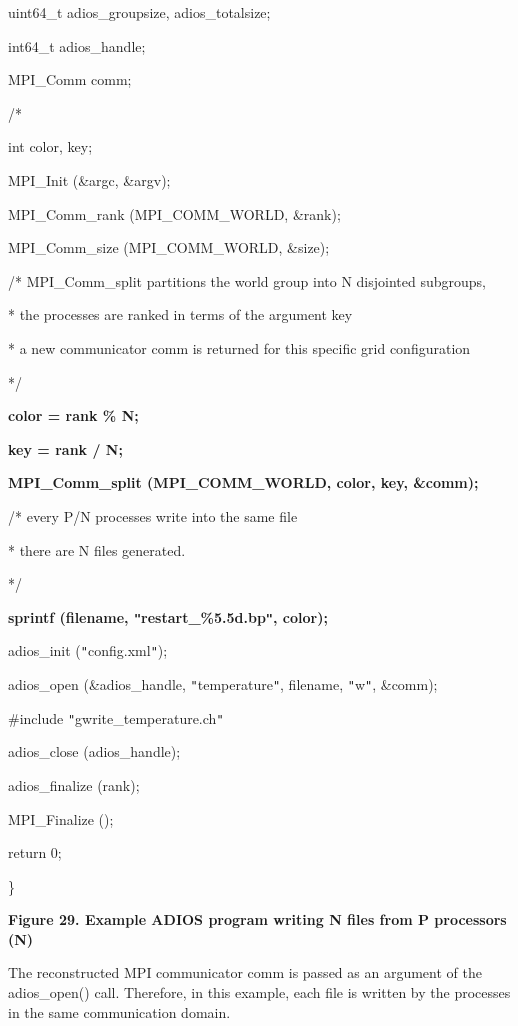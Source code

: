 uint64\_t      adios\_groupsize, adios\_totalsize;

int64\_t     adios\_handle;

MPI\_Comm comm;

/* 

int              color, key;

MPI\_Init (\&argc, \&argv);

MPI\_Comm\_rank (MPI\_COMM\_WORLD, \&rank);

MPI\_Comm\_size (MPI\_COMM\_WORLD, \&size);

/* MPI\_Comm\_split partitions the world group into N disjointed  subgroups, 

\parindent=7pt
* the processes are ranked in terms of the argument key  

*  a new communicator comm is returned for this specific grid configuration

*/

\parindent=0pt
{\color{color02} \textbf{color = rank \% N;}}

{\color{color02} \textbf{key = rank / N;}}

{\color{color02} \textbf{MPI\_Comm\_split (MPI\_COMM\_WORLD, color, key, \&comm);}}

/* every P/N processes write into the same file 

\parindent=7pt
* there are N files generated. 

*/

\parindent=0pt
{\color{color02} \textbf{sprintf (filename, \texttt{"}restart\_\%5.5d.bp\texttt{"}, 
color);}}

adios\_init (\texttt{"}config.xml\texttt{"});

adios\_open (\&adios\_handle, \texttt{"}temperature\texttt{"}, filename, \texttt{"}w\texttt{"}, 
\&comm);

\#include \texttt{"}gwrite\_temperature.ch\texttt{"}

adios\_close (adios\_handle);

adios\_finalize (rank);

MPI\_Finalize ();

return 0;

\leftskip=0pt
\}

\label{HRef119579635}\label{HToc144350188}

\leftskip=18pt
{\color{color20} \textbf{Figure 29. Example ADIOS program writing N files from 
P processors (N)}}

\leftskip=0pt
The reconstructed MPI communicator comm is passed as an argument of the adios\_open() 
call. Therefore, in this example, each file is written by the processes in the 
same communication domain.

